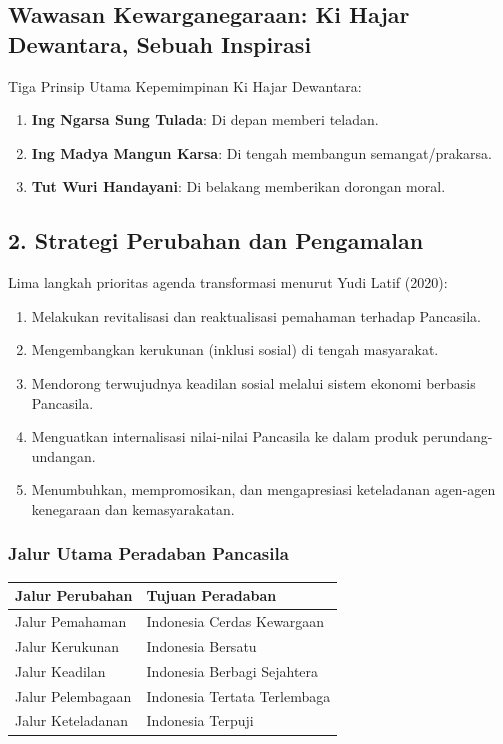 \subsection{Wawasan Kewarganegaraan: Ki Hajar Dewantara, Sebuah Inspirasi}
Tiga Prinsip Utama Kepemimpinan Ki Hajar Dewantara:
\begin{enumerate}
    \item \textbf{Ing Ngarsa Sung Tulada}: Di depan memberi teladan.
    \item \textbf{Ing Madya Mangun Karsa}: Di tengah membangun semangat/prakarsa.
    \item \textbf{Tut Wuri Handayani}: Di belakang memberikan dorongan moral.
\end{enumerate}

\subsection{2. Strategi Perubahan dan Pengamalan}
Lima langkah prioritas agenda transformasi menurut Yudi Latif (2020):
\begin{enumerate}
    \item Melakukan revitalisasi dan reaktualisasi pemahaman terhadap Pancasila.
    \item Mengembangkan kerukunan (inklusi sosial) di tengah masyarakat.
    \item Mendorong terwujudnya keadilan sosial melalui sistem ekonomi berbasis Pancasila.
    \item Menguatkan internalisasi nilai-nilai Pancasila ke dalam produk perundang-undangan.
    \item Menumbuhkan, mempromosikan, dan mengapresiasi keteladanan agen-agen kenegaraan dan kemasyarakatan.
\end{enumerate}

\subsubsection{Jalur Utama Peradaban Pancasila}
\begin{table}[h!]
\centering
\begin{tabular}{|l|l|}
\hline
\textbf{Jalur Perubahan} & \textbf{Tujuan Peradaban} \\ \hline
Jalur Pemahaman & Indonesia Cerdas Kewargaan \\ \hline
Jalur Kerukunan & Indonesia Bersatu \\ \hline
Jalur Keadilan & Indonesia Berbagi Sejahtera \\ \hline
Jalur Pelembagaan & Indonesia Tertata Terlembaga \\ \hline
Jalur Keteladanan & Indonesia Terpuji \\ \hline
\end{tabular}
\end{table}

